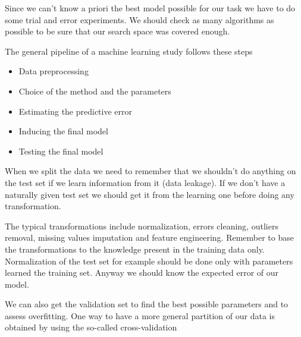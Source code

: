 Since we can't know a priori the best model possible for our task we have to do some trial and error experiments. We should check as many algorithms as possible to be sure that our search space was covered enough. 

\vspace{10pt}

The general pipeline of a machine learning study follows these steps 
\begin{itemize}
    \item Data preprocessing
    \item Choice of the method and the parameters
    \item Estimating the predictive error
    \item Inducing the final model
    \item Testing the final model
\end{itemize}

When we split the data we need to remember that we shouldn't do anything on the test set if we learn information from it (data leakage). If we don't have a naturally given test set we should get it from the learning one before doing any transformation. 

The typical transformations include normalization, errors cleaning, outliers removal, missing values imputation and feature engineering. Remember to base the transformations to the knowledge present in the training data only. Normalization of the test set for example should be done only with parameters learned the training set. Anyway we should know the expected error of our model. 

\vspace{10pt}

We can also get the validation set to find the best possible parameters and to assess overfitting. One way to have a more general partition of our data is obtained by using the so-called cross-validation
